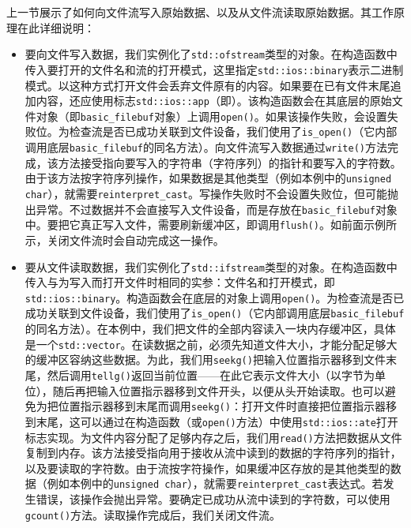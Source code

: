 
上一节展示了如何向文件流写入原始数据、以及从文件流读取原始数据。其工作原理在此详细说明：



\begin{itemize}
\item 要向文件写入数据，我们实例化了\texttt{std::\allowbreak{}ofstream}类型的对象。在构造函数中传入要打开的文件名和流的打开模式，这里指定\texttt{std::\allowbreak{}ios::\allowbreak{}binary}表示二进制模式。以这种方式打开文件会丢弃文件原有的内容。如果要在已有文件末尾追加内容，还应使用标志\texttt{std::\allowbreak{}ios::\allowbreak{}app}（即）。该构造函数会在其底层的原始文件对象（即\texttt{basic\_\allowbreak{}filebuf}对象）上调用\texttt{open()}。如果该操作失败，会设置失败位。为检查流是否已成功关联到文件设备，我们使用了\texttt{is\_\allowbreak{}open()}（它内部调用底层\texttt{basic\_\allowbreak{}filebuf}的同名方法）。向文件流写入数据通过\texttt{write()}方法完成，该方法接受指向要写入的字符串（字符序列）的指针和要写入的字符数。由于该方法按字符序列操作，如果数据是其他类型（例如本例中的\texttt{unsigned char}），就需要\texttt{reinterpret\_\allowbreak{}cast}。写操作失败时不会设置失败位，但可能抛出异常。不过数据并不会直接写入文件设备，而是存放在\texttt{basic\_\allowbreak{}filebuf}对象中。要把它真正写入文件，需要刷新缓冲区，即调用\texttt{flush()}。如前面示例所示，关闭文件流时会自动完成这一操作。



\item 要从文件读取数据，我们实例化了\texttt{std::\allowbreak{}ifstream}类型的对象。在构造函数中传入与为写入而打开文件时相同的实参：文件名和打开模式，即\texttt{std::\allowbreak{}ios::\allowbreak{}binary}。构造函数会在底层的对象上调用\texttt{open()}。为检查流是否已成功关联到文件设备，我们使用了\texttt{is\_\allowbreak{}open()}（它内部调用底层\texttt{basic\_\allowbreak{}filebuf}的同名方法）。在本例中，我们把文件的全部内容读入一块内存缓冲区，具体是一个\texttt{std::\allowbreak{}vector}。在读数据之前，必须先知道文件大小，才能分配足够大的缓冲区容纳这些数据。为此，我们用\texttt{seekg()}把输入位置指示器移到文件末尾，然后调用\texttt{tellg()}返回当前位置——在此它表示文件大小（以字节为单位），随后再把输入位置指示器移到文件开头，以便从头开始读取。也可以避免为把位置指示器移到末尾而调用\texttt{seekg()}：打开文件时直接把位置指示器移到末尾，这可以通过在构造函数（或\texttt{open()}方法）中使用\texttt{std::\allowbreak{}ios::\allowbreak{}ate}打开标志实现。为文件内容分配了足够内存之后，我们用\texttt{read()}方法把数据从文件复制到内存。该方法接受指向用于接收从流中读到的数据的字符序列的指针，以及要读取的字符数。由于流按字符操作，如果缓冲区存放的是其他类型的数据（例如本例中的\texttt{unsigned char}），就需要\texttt{reinterpret\_\allowbreak{}cast}表达式。若发生错误，该操作会抛出异常。要确定已成功从流中读到的字符数，可以使用\texttt{gcount()}方法。读取操作完成后，我们关闭文件流。

\end{itemize}


